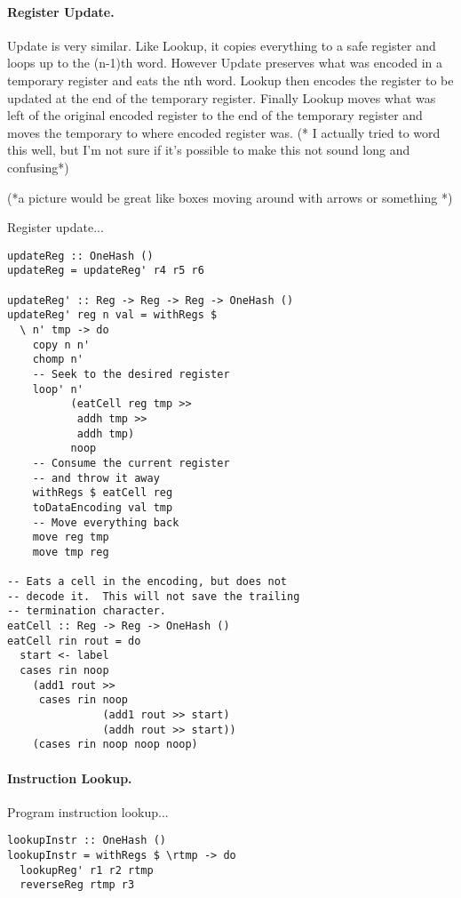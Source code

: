 \documentclass[10pt, preprint, nocopyrightspace]{sigplanconf}
\begin{document}
\paragraph{Register Update.}

Update is very similar. 
Like Lookup, it copies everything to a safe register and loops up to the
(n-1)th word. However Update preserves what was encoded in a temporary register
and eats the nth word. Lookup then encodes the register to be updated at the
end of the temporary register. Finally Lookup moves what was left of the
original encoded register to the end of the temporary register and moves the
temporary to where encoded register was. (* I actually tried to word this well,
but I’m not sure if it’s possible to make this not sound long and confusing*)

(*a picture would be great like boxes moving around with arrows or something *)


Register update...

\begin{lstlisting}
updateReg :: OneHash ()
updateReg = updateReg' r4 r5 r6

updateReg' :: Reg -> Reg -> Reg -> OneHash ()
updateReg' reg n val = withRegs $
  \ n' tmp -> do
    copy n n'
    chomp n'
    -- Seek to the desired register
    loop' n'
          (eatCell reg tmp >>
           addh tmp >>
           addh tmp)
          noop
    -- Consume the current register
    -- and throw it away
    withRegs $ eatCell reg
    toDataEncoding val tmp
    -- Move everything back
    move reg tmp
    move tmp reg

-- Eats a cell in the encoding, but does not
-- decode it.  This will not save the trailing
-- termination character.
eatCell :: Reg -> Reg -> OneHash ()
eatCell rin rout = do
  start <- label
  cases rin noop
    (add1 rout >>
     cases rin noop
               (add1 rout >> start)
               (addh rout >> start))
    (cases rin noop noop noop)
\end{lstlisting}

\paragraph{Instruction Lookup.}

Program instruction lookup...

\begin{lstlisting}
lookupInstr :: OneHash ()
lookupInstr = withRegs $ \rtmp -> do
  lookupReg' r1 r2 rtmp
  reverseReg rtmp r3
\end{lstlisting}
\end{document}
